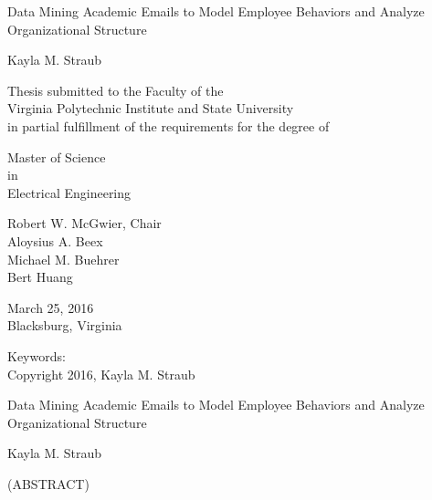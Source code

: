 \documentclass[12pt]{report}
\begin{document}
\thispagestyle{empty}
\begin{center}

{\Large 
Data Mining Academic Emails to Model Employee Behaviors and Analyze Organizational Structure
}

\vfill

Kayla M. Straub

\vfill

Thesis submitted to the Faculty of the \\
Virginia Polytechnic Institute and State University \\
in partial fulfillment of the requirements for the degree of

\vfill

Master of Science \\
in \\
Electrical Engineering
\vfill

Robert W. McGwier, Chair \\
Aloysius A. Beex\\
Michael M. Buehrer\\
Bert Huang

\vfill

March 25, 2016 \\
Blacksburg, Virginia

\vfill

Keywords: 
\\
Copyright 2016, Kayla M. Straub

\end{center}

\pagebreak

\thispagestyle{empty}
\begin{center}

{\large Data Mining Academic Emails to Model Employee Behaviors and Analyze Organizational Structure}

\vfill

Kayla M. Straub

\vfill

(ABSTRACT)

\vfill

\end{center}
\end{document}
